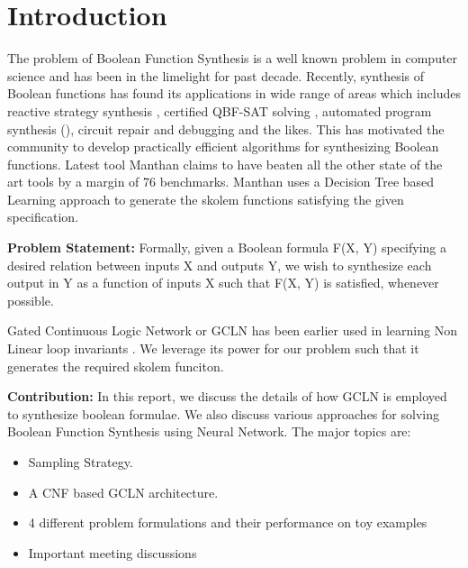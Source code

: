 
\section{Introduction}
\label{sec:intro}

The problem of Boolean Function Synthesis is a well known problem in computer science and has been in the limelight for past decade. Recently, synthesis of Boolean functions has found its applications in wide range of areas which includes reactive strategy synthesis \cite{Alur2005}, certified QBF-SAT solving \cite{Balabnav2012}, 
automated program synthesis (\cite{Solar2013, Gulwani2013}), circuit repair and debugging \cite{Jo} and the likes. This has motivated the community to develop practically efficient algorithms for synthesizing Boolean functions. Latest tool Manthan \cite{Manthan} claims to have beaten all the other state of the art tools by a margin of 76 benchmarks.
Manthan uses a Decision Tree based Learning approach to generate the skolem functions satisfying the given specification.

\noindent\textbf{Problem Statement:} Formally, given a Boolean formula F(X, Y) specifying a desired relation between inputs X and outputs Y, we wish to synthesize each output in Y as a function of inputs X such that F(X, Y) is satisfied, whenever possible.

\smallskip
Gated Continuous Logic Network or GCLN has been earlier used in learning Non Linear loop invariants \cite{gcln}. We leverage its power for our problem such that it generates the required skolem funciton.


\smallskip
\noindent\textbf{Contribution: } In this report, we discuss the details of how GCLN is employed to synthesize boolean formulae. We also discuss various approaches for solving Boolean Function Synthesis using Neural Network. The major topics are:
\begin{itemize}
\item  Sampling Strategy.
\item  A CNF based GCLN architecture.
\item  4 different problem formulations and their performance on toy examples
\item  Important meeting discussions
\end{itemize}